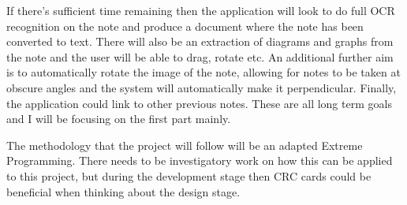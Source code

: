 \documentclass[11pt,fleqn,twoside]{article}
\begin{document}
If there's sufficient time remaining then the application will look to do full OCR recognition on the note and produce a document where the note has been converted to text. There will also be an extraction of diagrams and graphs from the note and the user will be able to drag, rotate etc. An additional further aim is to automatically rotate the image of the note, allowing for notes to be taken at obscure angles and the system will automatically make it perpendicular. Finally, the application could link to other previous notes. These are all long term goals and I will be focusing on the first part mainly.

The methodology that the project will follow will be an adapted Extreme Programming. There needs to be investigatory work on how this can be applied to this project, but during the development stage then CRC cards could be beneficial when thinking about the design stage.
\end{document}
